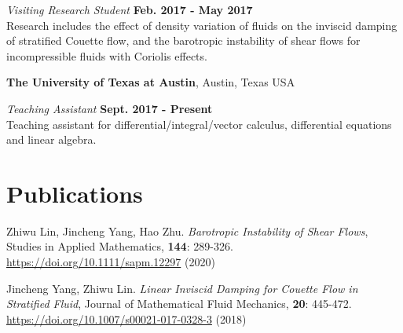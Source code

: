 \documentclass[margin,line]{res}
\begin{document}
\begin{resume}

{\em Visiting Research Student} \hfill {\bf Feb. 2017 - May 2017}\\
Research includes the effect of density variation of fluids on the inviscid damping of stratified Couette flow, and the barotropic instability of shear flows for incompressible fluids with Coriolis effects.

{\bf The University of Texas at Austin}, Austin, Texas USA

{\em Teaching Assistant} \hfill {\bf Sept. 2017 - Present}\\
Teaching assistant for differential/integral/vector calculus, differential equations and linear algebra.

\section{\sc Publications}

\begin{etaremune}[leftmargin=0.02in, start=2]
    \item Zhiwu Lin, Jincheng Yang, Hao Zhu. \textit{Barotropic Instability of Shear Flows}, Studies in Applied Mathematics, \textbf{144}: 289-326. 
    \href{https://doi.org/10.1111/sapm.12297}{https://doi.org/10.1111/sapm.12297} (2020) 
    \item Jincheng Yang, Zhiwu Lin. \textit{Linear Inviscid Damping for Couette Flow in Stratified Fluid}, Journal of Mathematical Fluid Mechanics, \textbf{20}: 445-472. \href{https://doi.org/10.1007/s00021-017-0328-3}{https://doi.org/10.1007/s00021-017-0328-3} (2018)
\end{etaremune}


\end{resume}
\end{document}
